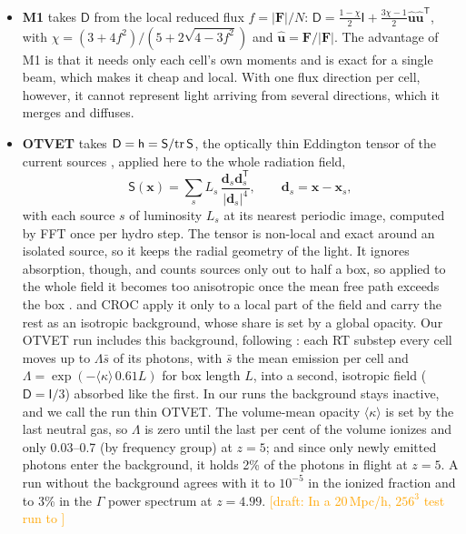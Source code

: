 \documentclass[11pt]{article}
\newcommand{\draft}[1]{\textcolor{orange}{[draft: #1]}}
\newcommand{\T}{^{\mathsf T}}
\begin{document}
\begin{itemize}
\item \textbf{M1} \citep{levermore84} takes $\mathsf D$ from the local
  reduced flux $f=|\mathbf F|/N$:
  $\mathsf D=\frac{1-\chi}{2}\mathsf I+\frac{3\chi-1}{2}\hat{\mathbf u}\hat{\mathbf u}\T$,
  with $\chi=(3+4f^2)/(5+2\sqrt{4-3f^2})$ and $\hat{\mathbf u}=\mathbf F/|\mathbf F|$.
The advantage of M1 is that it needs only each cell's own moments and is exact for a single beam,
  which makes it cheap and local. With one flux direction
  per cell, however, it cannot represent light arriving from several
  directions, which it merges and diffuses.
\item \textbf{OTVET} takes $\mathsf D=\mathsf h=\mathsf S/{\rm tr}\,\mathsf S$,
  the optically thin Eddington tensor of the current sources
  \citep{gnedin01}, applied here to the whole radiation field,
  \begin{equation}
  \mathsf S(\mathbf x)=\sum_s L_s\,\frac{\mathbf d_s\mathbf d_s\T}{|\mathbf d_s|^4},
  \qquad \mathbf d_s=\mathbf x-\mathbf x_s,
  \label{eqn:otvet}
  \end{equation}
  with each source $s$ of luminosity $L_s$ at its nearest periodic image,
  computed by FFT once per hydro step. The tensor is non-local and exact
  around an isolated source, so it keeps the radial geometry of the
  light. It ignores absorption, though, and counts sources only out to
  half a box, so applied to the whole field it becomes too anisotropic
  once the mean free path exceeds the box \citep{wu21}. \citet{gnedin01}
  and CROC \citep{gnedin14} apply it only to a local part of the field
  and carry the rest as an isotropic background, whose share is set by a
  global opacity. Our OTVET run includes this background, following
  \citet{gnedin01}: each RT substep every cell moves up to $\Lambda\bar s$
  of its photons, with $\bar s$ the mean emission per cell and
  $\Lambda=\exp(-\langle\kappa\rangle\,0.61L)$ for box length $L$, into a
  second, isotropic field ($\mathsf D=\mathsf I/3$) absorbed like the
  first. In our runs the background stays inactive, and we call the run
  thin OTVET. The volume-mean opacity $\langle\kappa\rangle$ is set by the
  last neutral gas, so $\Lambda$ is zero until the last per cent of the
  volume ionizes and only 0.03--0.7 (by frequency group) at $z=5$; and since
  only newly emitted photons enter the background, it holds 2\% of the
  photons in flight at $z=5$. A run without the background agrees with it
  to $10^{-5}$ in the ionized fraction and to 3\% in the $\Gamma$ power
  spectrum at $z=4.99$. \draft{In a 20\,Mpc/h, $256^3$ test run to
}
\end{itemize}
\end{document}
